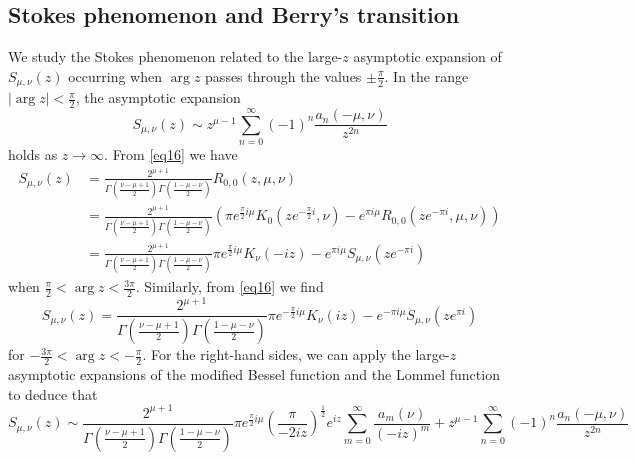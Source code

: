 \documentclass[a4paper,twoside,10pt]{amsart}
\numberwithin{equation}{section}
\begin{document}
\subsection{Stokes phenomenon and Berry's transition} We study the Stokes phenomenon related to the large-$z$ asymptotic expansion of $S_{\mu,\nu}\left(z\right)$ occurring when $\arg z$ passes through the values $\pm \frac{\pi}{2}$. In the range $\left|\arg z\right|<\frac{\pi}{2}$, the asymptotic expansion
\begin{equation}\label{eq15}
S_{\mu ,\nu } \left( z \right) \sim z^{\mu  - 1} \sum\limits_{n = 0}^\infty  {\left( { - 1} \right)^n \frac{{a_n \left( { - \mu ,\nu } \right)}}{{z^{2n} }}} 
\end{equation}
holds as $z \to \infty$. From \eqref{eq16} we have
\begin{align*}
S_{\mu ,\nu } \left( z \right) & = \frac{{2^{\mu  + 1} }}{{\Gamma \left( {\frac{{\nu  - \mu  + 1}}{2}} \right)\Gamma \left( {\frac{{1 - \mu  - \nu }}{2}} \right)}} R_{0,0} \left( {z,\mu ,\nu } \right) \\ & = \frac{{2^{\mu  + 1} }}{{\Gamma \left( {\frac{{\nu  - \mu  + 1}}{2}} \right)\Gamma \left( {\frac{{1 - \mu  - \nu }}{2}} \right)}} \left(\pi e^{\frac{\pi }{2}i\mu } K_0 \left( {ze^{ - \frac{\pi }{2}i} ,\nu } \right) -  e^{\pi i\mu } R_{0,0} \left( {ze^{ - \pi i} ,\mu ,\nu } \right) \right)\\ & = \frac{{2^{\mu  + 1} }}{{\Gamma \left( {\frac{{\nu  - \mu  + 1}}{2}} \right)\Gamma \left( {\frac{{1 - \mu  - \nu }}{2}} \right)}} \pi e^{\frac{\pi }{2}i\mu } K_\nu  \left( { - iz} \right) - e^{\pi i\mu } S_{\mu ,\nu } \left( {ze^{ - \pi i} } \right)
\end{align*}
when $\frac{\pi}{2} < \arg z < \frac{3\pi}{2}$. Similarly, from \eqref{eq16} we find
\[
S_{\mu ,\nu } \left( z \right) = \frac{{2^{\mu  + 1} }}{{\Gamma \left( {\frac{{\nu  - \mu  + 1}}{2}} \right)\Gamma \left( {\frac{{1 - \mu  - \nu }}{2}} \right)}}\pi e^{ - \frac{\pi }{2}i\mu } K_\nu  \left( {iz} \right) - e^{ - \pi i\mu } S_{\mu ,\nu } \left( {ze^{\pi i} } \right)
\]
for $-\frac{3\pi}{2} < \arg z < -\frac{\pi}{2}$. For the right-hand sides, we can apply the large-$z$ asymptotic expansions of the modified Bessel function and the Lommel function to deduce that
\[
S_{\mu ,\nu } \left( z \right) \sim \frac{{2^{\mu  + 1} }}{{\Gamma \left( {\frac{{\nu  - \mu  + 1}}{2}} \right)\Gamma \left( {\frac{{1 - \mu  - \nu }}{2}} \right)}}\pi e^{\frac{\pi }{2}i\mu } \left( {\frac{\pi }{{ - 2iz}}} \right)^{\frac{1}{2}} e^{iz} \sum\limits_{m = 0}^\infty  {\frac{{a_m \left( \nu  \right)}}{{\left( { - iz} \right)^m }}}  + z^{\mu  - 1} \sum\limits_{n = 0}^\infty  {\left( { - 1} \right)^n \frac{{a_n \left( { - \mu ,\nu } \right)}}{{z^{2n} }}} 
\]
\end{document}
